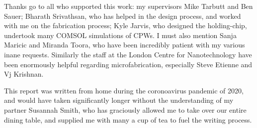 Thanks go to all who supported this work: my supervisors Mike Tarbutt and Ben
Sauer; Bharath Srivathsan, who has helped in the design process, and worked
with me on the fabrication process; Kyle Jarvis, who designed the holding-chip,
undertook many COMSOL simulations of CPWs.  I must also mention Sanja Maricic
and Miranda Toora, who have been incredibly patient with my various inane
requests. Similarly the staff at the London Centre for Nanotechnology have been
enormously helpful regarding microfabrication, especially Steve Etienne and Vj
Krishnan.

This report was written from home during the coronoavirus pandemic of 2020, and
would have taken significantly longer without the understanding of my partner
Susannah Smith, who has graciously allowed me to take over our entire dining
table, and supplied me with many a cup of tea to fuel the writing process.

